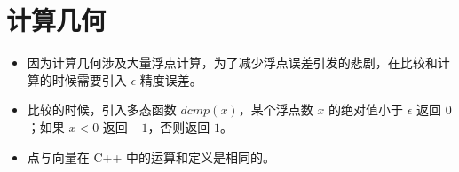 \chapter{计算几何}

\begin{itemize}
    \item 因为计算几何涉及大量浮点计算，为了减少浮点误差引发的悲剧，在比较和计算的时候需要引入 $\epsilon$ 精度误差。
    \item 比较的时候，引入多态函数 $dcmp(x)$，某个浮点数 $x$ 的绝对值小于 $\epsilon$ 返回 $0$；如果 $x < 0$ 返回 $-1$，否则返回 $1$。
    \item 点与向量在 C++ 中的运算和定义是相同的。
\end{itemize}























